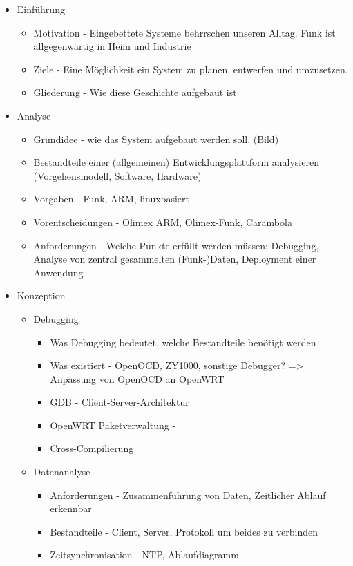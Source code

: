 \begin{itemize}
  \item Einführung
  \begin{itemize}
    \item Motivation - Eingebettete Systeme behrrschen unseren Alltag. Funk ist
    allgegenwärtig in Heim und Industrie
    \item Ziele - Eine Möglichkeit ein System zu planen, entwerfen und
    umzusetzen.
    \item Gliederung - Wie diese Geschichte aufgebaut ist
  \end{itemize}
  \item Analyse
  \begin{itemize}
    \item Grundidee - wie das System aufgebaut werden soll. (Bild)
    \item Bestandteile einer (allgemeinen) Entwicklungsplattform analysieren
    (Vorgehensmodell, Software, Hardware)
    \item Vorgaben - Funk, ARM, linuxbasiert
    \item Vorentscheidungen - Olimex ARM, Olimex-Funk, Carambola
    \item Anforderungen - Welche Punkte erfüllt werden müssen: Debugging,
    Analyse von zentral gesammelten (Funk-)Daten, Deployment einer Anwendung
  \end{itemize}
  \item Konzeption
  \begin{itemize}
    \item Debugging
    \begin{itemize}
      \item Was Debugging bedeutet, welche Bestandteile benötigt werden
      \item Was existiert - OpenOCD, ZY1000, sonstige
      Debugger? => Anpassung von OpenOCD an OpenWRT
      \item GDB - Client-Server-Architektur
      \item OpenWRT Paketverwaltung - 
      \item Cross-Compilierung
  	\end{itemize}
  	\item Datenanalyse
  	\begin{itemize}
  	  \item Anforderungen - Zusammenführung von Daten, Zeitlicher Ablauf
  	  erkennbar
  	  \item Bestandteile - Client, Server, Protokoll um beides zu verbinden
  	  \item Zeitsynchronisation - NTP, Ablaufdiagramm

\end{itemize}
\end{itemize}
\end{itemize}
